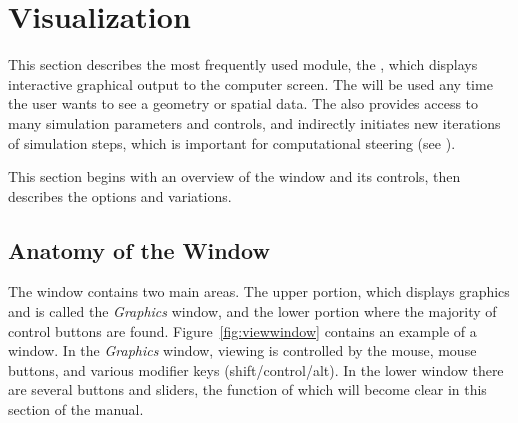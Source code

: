   \newcommand{\boxwidget}%
  {\centerline{\epsfig{file=Figures/widget-box.eps.gz,height=2in,
  bbllx=0, bblly=0, bburx=458, bbury=342}}}
\begin{htmlonly}
  \newcommand{\boxwidget}{%
  \htmladdimg[align=top,width=459,alt="boxwidget"]
  {../Figures/widget-box.gif}}
\end{htmlonly}

  \newcommand{\ringwidget}%
  {\centerline{\epsfig{file=Figures/widget-ring.eps.gz,height=2in,
  bbllx=0, bblly=0, bburx=507, bbury=467}}}
\begin{htmlonly}
  \newcommand{\ringwidget}{%
  \htmladdimg[align=top,width=508,alt="ringwidget"]
  {../Figures/widget-ring.gif}}
\end{htmlonly}

\newcommand{\graphics}{\emph{Graphics}}

\section{Visualization}
\label{sec:viewer}

This section describes the most frequently used \sr{} module,
the \viewer{}, which displays interactive graphical
output to the computer screen.  The \viewer{} will be used any time the user
wants to see a geometry or spatial data. The \viewer{} also provides access to
many simulation parameters and controls, and indirectly initiates new
iterations of  simulation steps, which is important for computational steering (see ).

This section begins with an overview of the \viewer{} window and its
controls, then describes the options and variations.

\subsection{Anatomy of the \viewer{} Window}
\label{sec:viewer-anatomy} 

The \viewer{} window contains two main areas.  The upper portion,
which displays graphics and is called the \graphics{} window, and the
lower portion where the majority of control buttons are found.
Figure~\ref{fig:viewwindow} contains an example of a \viewer{} window.
In the \graphics{} window, viewing is controlled by the mouse, mouse
buttons, and various modifier keys (shift/control/alt).  In the lower
window there are several buttons and sliders, the function of which
will become clear in this section of the manual.


